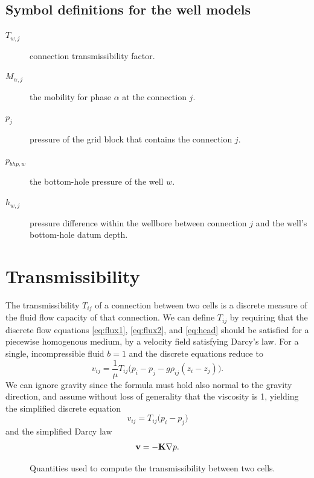 \subsection{Symbol definitions for the well models}
\label{appendix:nomenclature:well}

\begin{description}
\item[$T_{w,j}$]  connection transmissibility factor.
\item[$M_{\alpha,j}$] the
  mobility for phase $\alpha$ at the connection $j$.
\item[$p_j$]  pressure of the grid block that contains the connection $j$.
\item[$p_{bhp, w}$] the bottom-hole pressure of the well $w$.
\item[$h_{w,j}$] pressure difference within the wellbore between connection $j$ and the
  well's bottom-hole datum depth.
\end{description}

\section{Transmissibility}
\label{appendix:trans}

The transmissibility $T_{ij}$ of a connection between two cells
is a discrete measure of the fluid flow capacity of that
connection. We can define $T_{ij}$ by requiring that the discrete flow
equations \eqref{eq:flux1}, \eqref{eq:flux2}, and \eqref{eq:head}
should be satisfied for a piecewise homogenous medium, by a velocity
field satisfying Darcy's law. For a single, incompressible fluid
$b = 1$ and the discrete equations reduce to
\begin{equation}
  v_{ij} = \frac{1}{\mu} T_{ij}\big( p_i - p_j - g\rho_{ij}(z_i - z_j) \big).
\end{equation}
We can ignore gravity since the formula must hold also
normal to the gravity direction, and assume without loss of generality
that the viscosity is 1, yielding the simplified discrete equation
\begin{equation}
  v_{ij} = T_{ij}\big( p_i - p_j\big)
\end{equation}
and the simplified Darcy law
\begin{equation}\label{eq:simpledarcy}
  {\bf v} = -{\bf K} \nabla p.
\end{equation}

\begin{figure}
  \center
  
  \caption{Quantities used to compute the transmissibility between two cells.}
  \label{fig:transmissibility}
\end{figure}
 

